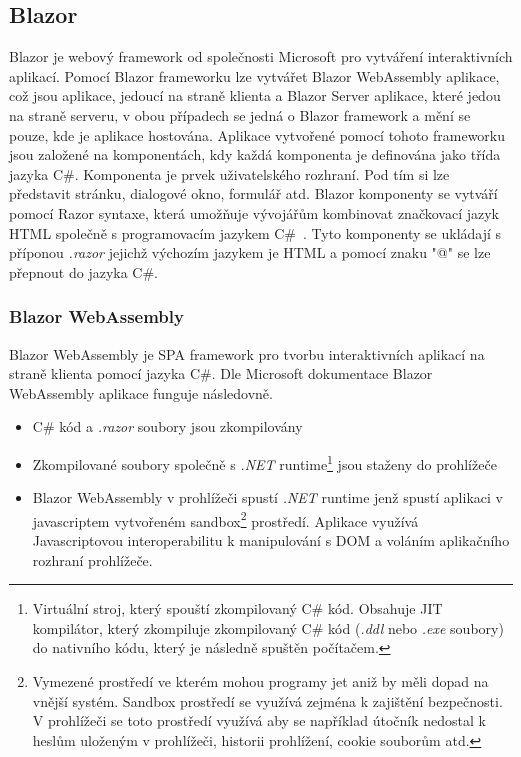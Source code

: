     \subsection{Blazor}
    Blazor je webový framework od společnosti Microsoft pro vytváření interaktivních aplikací. Pomocí Blazor frameworku lze vytvářet Blazor WebAssembly aplikace, což jsou aplikace, jedoucí na straně klienta a Blazor Server aplikace, které jedou na straně serveru, v obou případech se jedná o Blazor framework a mění se pouze, kde je aplikace hostována. Aplikace vytvořené pomocí tohoto frameworku jsou založené na komponentách, kdy každá komponenta je definována jako třída jazyka C\#. Komponenta je prvek uživatelského rozhraní. Pod tím si lze představit stránku, dialogové okno, formulář atd. Blazor komponenty se vytváří pomocí Razor syntaxe, která umožňuje vývojářům kombinovat značkovací jazyk HTML společně s programovacím jazykem C\#~\cite{MicrosoftBlazor}. Tyto komponenty se ukládají s příponou \textit{.razor} jejichž výchozím jazykem je HTML a pomocí znaku "@" se lze přepnout do jazyka C\#.
    
    \subsubsection*{Blazor WebAssembly}
    Blazor WebAssembly je SPA framework pro tvorbu interaktivních aplikací na straně klienta pomocí jazyka C\#. Dle Microsoft dokumentace Blazor WebAssembly aplikace funguje následovně. 
    \begin{itemize}
        \item C\# kód a \textit{.razor} soubory jsou zkompilovány
        \item Zkompilované soubory společně s \textit{.NET} runtime\footnote{Virtuální stroj, který spouští zkompilovaný C\# kód. Obsahuje JIT kompilátor, který zkompiluje zkompilovaný C\# kód (\textit{.ddl} nebo \textit{.exe} soubory) do nativního kódu, který je následně spuštěn počítačem.} jsou staženy do prohlížeče
        \item Blazor WebAssembly v prohlížeči spustí \textit{.NET} runtime jenž spustí aplikaci v javascriptem vytvořeném sandbox\footnote{Vymezené prostředí ve kterém mohou programy jet aniž by měli dopad na vnější systém. Sandbox prostředí se využívá zejména k zajištění bezpečnosti. V prohlížeči se toto prostředí využívá aby se například útočník nedostal k heslům uloženým v prohlížeči, historii prohlížení, cookie souborům atd.} prostředí. Aplikace využívá Javascriptovou interoperabilitu k manipulování s DOM a voláním aplikačního rozhraní prohlížeče.

    \end{itemize}
    
